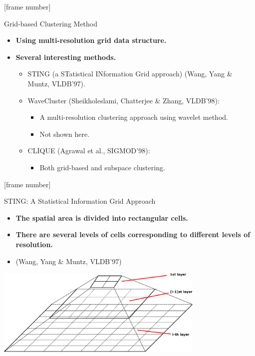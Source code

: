 \documentclass[aspectratio=169,t,xcolor=dvipsnames]{beamer}
\begin{document}
  {
    [frame number]
    \begin{frame}{Grid-based Clustering Method}
      \begin{itemize}
        \item \textbf{Using multi-resolution grid data structure.}
        \item \textbf{Several interesting methods.}
        \begin{itemize}
          \item STING (a STatistical INformation Grid approach) (Wang, Yang \& Muntz, VLDB'97).
          \item WaveCluster (Sheikholeslami, Chatterjee \& Zhang, VLDB'98):
          \begin{itemize}
            \item A multi-resolution clustering approach using wavelet method.
            \item Not shown here.
          \end{itemize}
          \item CLIQUE (Agrawal et al., SIGMOD'98):
          \begin{itemize}
            \item Both grid-based and subspace clustering.
          \end{itemize}
        \end{itemize}
      \end{itemize}
    \end{frame}
  }

  {
    [frame number]
    \begin{frame}{STING: A Statistical Information Grid Approach}
      \begin{itemize}
        \item \textbf{The spatial area is divided into rectangular cells.}
        \item \textbf{There are several levels of cells corresponding to different levels of resolution.}
        \item (Wang, Yang \& Muntz, VLDB'97)
      \end{itemize}
      \vspace{0.5cm}
      \centering
      \includegraphics[width=10cm]{img/layers.pdf}
    \end{frame}
  }
\end{document}
